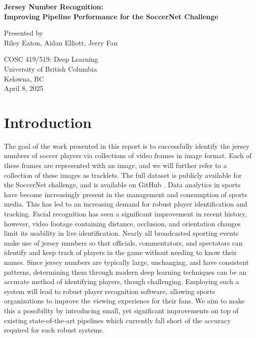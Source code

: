 \documentclass[11pt, letterpaper]{article}
\begin{document}
\begin{titlepage}
  \begin{center}
      \vspace*{2cm}
      
      \fontsize{14}{14}\textbf{Jersey Number Recognition:} \\
      \vspace{0.1cm}
      \fontsize{14}{14}\textbf{Improving Pipeline Performance for the SoccerNet Challenge}
      
      \vspace{0.5cm}
      Presented by \\
      Riley Eaton, Aidan Elliott, Jerry Fan
      
      \vfill
      
      COSC 419/519: Deep Learning \\
      University of British Columbia \\
      Kelowna, BC \\
      April 8, 2025

  \end{center}
\end{titlepage}

\clearpage
\section{Introduction}
The goal of the work presented in this report is to successfully identify the jersey numbers of soccer players via collections of video frames in image format. Each of these frames are represented with an image, and we will further refer to a collection of these images as tracklets. The full dataset is publicly available for the SoccerNet challenge, and is available on GitHub \cite{soccernet_repo}. Data analytics in sports have become increasingly present in the management and consumption of sports media. This has led to an increasing demand for robust player identification and tracking. Facial recognition has seen a significant improvement in recent history, however, video footage containing distance, occlusion, and orientation changes limit its usability in live identification. Nearly all broadcasted sporting events make use of jersey numbers so that officials, commentators, and spectators can identify and keep track of players in the game without needing to know their names. Since jersey numbers are typically large, unchanging, and have consistent patterns, determining them through modern deep learning techniques can be an accurate method of identifying players, though challenging. Employing such a system will lead to robust player recognition software, allowing sports organizations to improve the viewing experience for their fans. We aim to make this a possibility by introducing small, yet significant improvements on top of existing state-of-the-art pipelines which currently fall short of the accuracy required for such robust systems.
\end{document}
